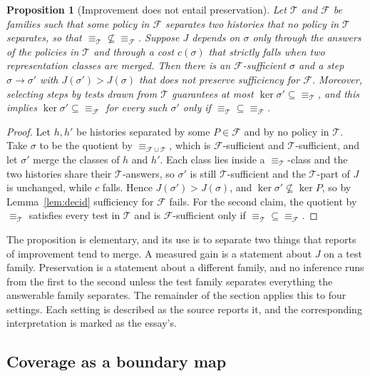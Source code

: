 \documentclass[11pt]{article}
\newtheorem{proposition}{Proposition}
\theoremstyle{definition}
\theoremstyle{remark}
\newcommand{\eqv}[1]{\equiv_{#1}}
\begin{document}
\begin{proposition}[Improvement does not entail preservation]\label{prop:improve}
Let $\mathcal{T}$ and $\mathcal{F}$ be families such that some policy in $\mathcal{F}$ separates two histories that no policy in $\mathcal{T}$ separates, so that $\eqv{\mathcal{T}}\not\subseteq\eqv{\mathcal{F}}$. Suppose $J$ depends on $\sigma$ only through the answers of the policies in $\mathcal{T}$ and through a cost $c(\sigma)$ that strictly falls when two representation classes are merged. Then there is an $\mathcal{F}$-sufficient $\sigma$ and a step $\sigma\to\sigma'$ with $J(\sigma')>J(\sigma)$ that does not preserve sufficiency for $\mathcal{F}$. Moreover, selecting steps by tests drawn from $\mathcal{T}$ guarantees at most $\ker\sigma'\subseteq\eqv{\mathcal{T}}$, and this implies $\ker\sigma'\subseteq\eqv{\mathcal{F}}$ for every such $\sigma'$ only if $\eqv{\mathcal{T}}\subseteq\eqv{\mathcal{F}}$.
\end{proposition}

\begin{proof}
Let $h,h'$ be histories separated by some $P\in\mathcal{F}$ and by no policy in $\mathcal{T}$. Take $\sigma$ to be the quotient by $\eqv{\mathcal{F}\cup\mathcal{T}}$, which is $\mathcal{F}$-sufficient and $\mathcal{T}$-sufficient, and let $\sigma'$ merge the classes of $h$ and $h'$. Each class lies inside a $\eqv{\mathcal{T}}$-class and the two histories share their $\mathcal{T}$-answers, so $\sigma'$ is still $\mathcal{T}$-sufficient and the $\mathcal{T}$-part of $J$ is unchanged, while $c$ falls. Hence $J(\sigma')>J(\sigma)$, and $\ker\sigma'\not\subseteq\ker P$, so by Lemma~\ref{lem:decid} sufficiency for $\mathcal{F}$ fails. For the second claim, the quotient by $\eqv{\mathcal{T}}$ satisfies every test in $\mathcal{T}$ and is $\mathcal{F}$-sufficient only if $\eqv{\mathcal{T}}\subseteq\eqv{\mathcal{F}}$.
\end{proof}

The proposition is elementary, and its use is to separate two things that reports of improvement tend to merge. A measured gain is a statement about $J$ on a test family. Preservation is a statement about a different family, and no inference runs from the first to the second unless the test family separates everything the answerable family separates. The remainder of the section applies this to four settings. Each setting is described as the source reports it, and the corresponding interpretation is marked as the essay's.

\subsection{Coverage as a boundary map}
\end{document}
